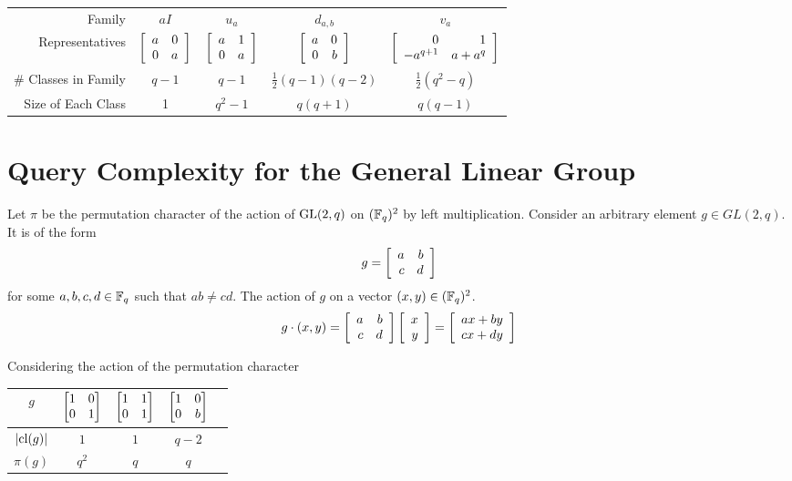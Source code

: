 \begin{center}
\begin{tabular}{r|cccc}
    Family & \vphantom{\Bigg|} $aI$ & $u_a$ & $d_{a,b}$ & $v_a$  \\
    \vphantom{\Bigg|}Representatives & $ \left[\begin{array}{rr}a&0\\0&a\end{array}\right]$ & $ \left[\begin{array}{rr}a&1\\0&a\end{array}\right]$ & $ \left[\begin{array}{rr}a&0\\0&b\end{array}\right] $ & $ 
    \left[\begin{array}{rr}0&1\\-a^{q+1}&a + a^q\end{array}\right]$ \\
\# Classes in Family & \vphantom{\Bigg|}$q-1$ & $q-1$ & $\frac{1}{2}(q-1)(q-2)$ & $\frac{1}{2}(q^2 -q)$ \\
\vphantom{\Bigg|} Size of Each Class & 1 & $q^2 - 1$ & $q(q+1)$ & $q(q-1)$
\end{tabular}
\end{center}




\section{Query Complexity for the General Linear Group}

Let $\pi$ be the permutation character of the action of $\operatorname{GL}(2, q)$ on $(\mathbb{F}_q)^2$ by left multiplication. Consider 
an arbitrary element $g \in GL(2,q)$. It is of the form
\[
    g = \left[\begin{array}{rr}a&b\\c&d\end{array}\right]
\]
for some $a,b,c,d \in \mathbb{F}_q$ such that $ab \neq cd$. The action of $g$ on a vector $(x,y) \in (\mathbb{F}_q)^2$.
\[
    g\cdot(x,y) = \left[\begin{array}{rr}a&b\\c&d\end{array}\right] \left[\begin{array}{r}x\\y\end{array}\right] = \left[\begin{array}{r}ax + by\\cx + dy\end{array}\right]
\]

Considering the action of the permutation character 

\begin{center}
\begin{tabular}{c|cccc}
    \vphantom{\Bigg|} $g$ & $ \begin{bmatrix} 1 & 0 \\ 0 & 1 \end{bmatrix}$ & $\begin{bmatrix} 1 & 1 \\ 0 & 1 \end{bmatrix}$ &
    $\begin{bmatrix} 1 & 0 \\ 0 & b \end{bmatrix}$ \\ \hline
\vphantom{\Bigg|} $|\text{cl}(g)|$ & $1$ & $1$ & $q-2$ \\
\vphantom{\Bigg|} $\pi(g)$ & $q^2$ & $q$ & $q$
\end{tabular}
\end{center}







